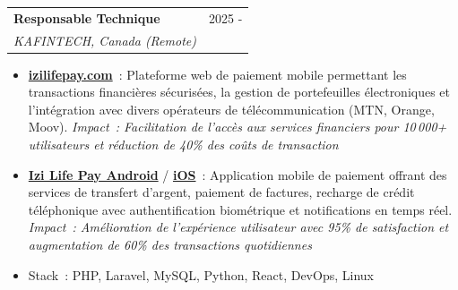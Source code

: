 \documentclass[12pt, a4paper]{article}
\begin{document}
\vspace{2pt}
\noindent\begin{tabularx}{\linewidth}{@{}X r@{}}
  {\bfseries\color{primary}Responsable Technique} &
  {\small\textcolor{textgray}{2025 -}} \\
  {\itshape\color{textgray}KAFINTECH, Canada (Remote)} & \\
\end{tabularx}
\begin{itemize}[leftmargin=1.4em, itemsep=1pt, topsep=2pt, parsep=0pt]
  \item \href{https://izilifepay.com/}{\textbf{izilifepay.com}}~: Plateforme web de paiement mobile permettant les transactions financi\`eres s\'ecuris\'ees, la gestion de portefeuilles \'electroniques et l'int\'egration avec divers op\'erateurs de t\'el\'ecommunication (MTN, Orange, Moov). \textit{Impact~: Facilitation de l'acc\`es aux services financiers pour 10\,000+ utilisateurs et r\'eduction de 40\% des co\^uts de transaction}
  \item \href{https://play.google.com/store/apps/details?id=com.easylifepay.easy_life_pay}{\textbf{Izi Life Pay Android}} / \href{https://apps.apple.com/us/app/izi-life-pay/id6754771394}{\textbf{iOS}}~: Application mobile de paiement offrant des services de transfert d'argent, paiement de factures, recharge de cr\'edit t\'el\'ephonique avec authentification biom\'etrique et notifications en temps r\'eel. \textit{Impact~: Am\'elioration de l'exp\'erience utilisateur avec 95\% de satisfaction et augmentation de 60\% des transactions quotidiennes}
  \item Stack~: PHP, Laravel, MySQL, Python, React, DevOps, Linux
\end{itemize}
\end{document}
